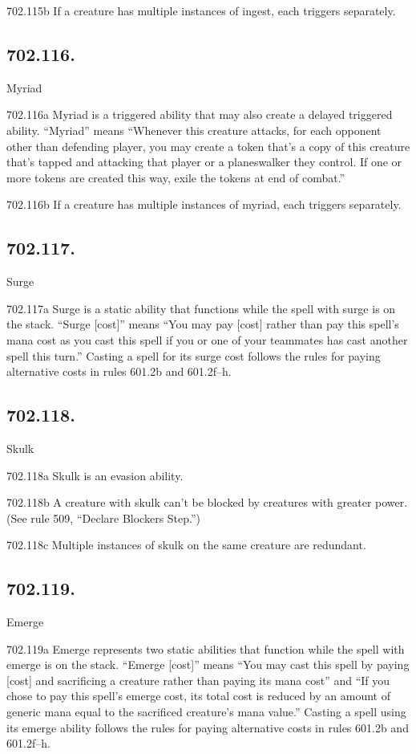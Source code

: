 702.115b If a creature has multiple instances of ingest, each triggers separately.

\subsection*{702.116.}
Myriad

702.116a Myriad is a triggered ability that may also create a delayed triggered ability. “Myriad” means “Whenever this creature attacks, for each opponent other than defending player, you may create a token that’s a copy of this creature that’s tapped and attacking that player or a planeswalker they control. If one or more tokens are created this way, exile the tokens at end of combat.”

702.116b If a creature has multiple instances of myriad, each triggers separately.

\subsection*{702.117.}
Surge

702.117a Surge is a static ability that functions while the spell with surge is on the stack. “Surge [cost]” means “You may pay [cost] rather than pay this spell’s mana cost as you cast this spell if you or one of your teammates has cast another spell this turn.” Casting a spell for its surge cost follows the rules for paying alternative costs in rules 601.2b and 601.2f–h.

\subsection*{702.118.}
Skulk

702.118a Skulk is an evasion ability.

702.118b A creature with skulk can’t be blocked by creatures with greater power. (See rule 509, “Declare Blockers Step.”)

702.118c Multiple instances of skulk on the same creature are redundant.

\subsection*{702.119.}
Emerge

702.119a Emerge represents two static abilities that function while the spell with emerge is on the stack. “Emerge [cost]” means “You may cast this spell by paying [cost] and sacrificing a creature rather than paying its mana cost” and “If you chose to pay this spell’s emerge cost, its total cost is reduced by an amount of generic mana equal to the sacrificed creature’s mana value.” Casting a spell using its emerge ability follows the rules for paying alternative costs in rules 601.2b and 601.2f–h.

